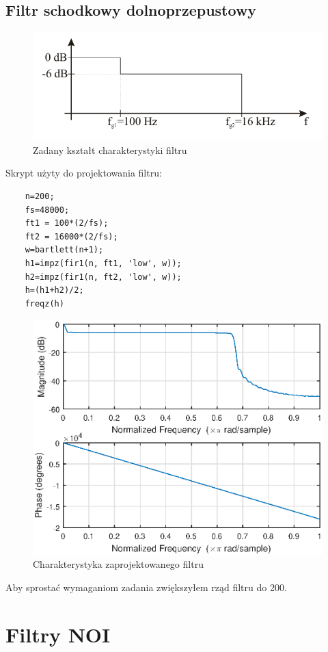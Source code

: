 \documentclass[12pt,titlepage]{report}
\begin{document}
\subsection{Filtr schodkowy dolnoprzepustowy}
\begin{figure}[!h]
	\centering
	\includegraphics[scale=0.5]{../cw34_polecenie}
	\caption{Zadany kształt charakterystyki filtru}
\end{figure}
Skrypt użyty do projektowania filtru:
{
	\tiny
	\begin{verbatim}
	n=200;
	fs=48000;
	ft1 = 100*(2/fs);
	ft2 = 16000*(2/fs);
	w=bartlett(n+1);
	h1=impz(fir1(n, ft1, 'low', w));
	h2=impz(fir1(n, ft2, 'low', w));
	h=(h1+h2)/2;
	freqz(h)
	\end{verbatim}
}
\begin{figure}[!h]
	\centering
	\includegraphics[scale=0.7]{../cw34_output}
	\caption{Charakterystyka zaprojektowanego filtru}
\end{figure}
Aby sprostać wymaganiom zadania zwiększyłem rząd filtru do 200.
\newpage

\section{Filtry NOI}
\end{document}
